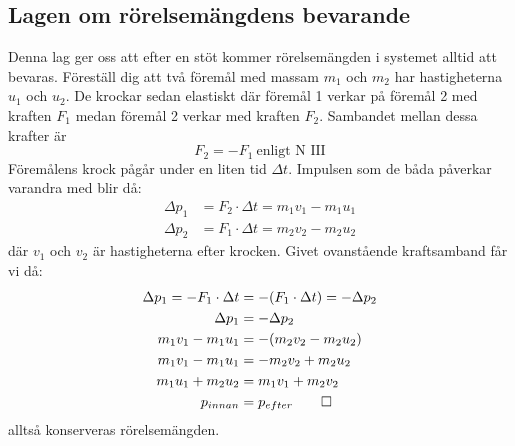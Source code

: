 \subsection{Lagen om rörelsemängdens bevarande}
\label{derive:conserverationmomentum}
Denna lag ger oss att efter en stöt kommer rörelsemängden i systemet alltid att bevaras. Föreställ dig att två föremål med massam $m_1$ och $m_2$ har hastigheterna $u_1$ och $u_2$. De krockar sedan elastiskt där föremål 1 verkar på föremål 2 med kraften $F_1$ medan föremål 2 verkar med kraften $F_2$. Sambandet mellan dessa krafter är
\begin{equation*}
    F_2 = -F_1 \: \text{enligt N III}
\end{equation*}
Föremålens krock pågår under en liten tid $\Delta t$. Impulsen som de båda påverkar varandra med blir då:
\begin{align*}
    \Delta p_1 &= F_2 \cdot \Delta t = m_1v_1 - m_1u_1 \\
    \Delta p_2 &= F_1 \cdot \Delta t = m_2v_2 - m_2u_2
\end{align*}
där $v_1$ och $v_2$ är hastigheterna efter krocken. Givet ovanstående kraftsamband får vi då:
\begin{align*}
    \Delta p_1 = -F_1 \cdot \Delta t &= -(F_1 \cdot \Delta t) = -\Delta p_2 \\
    \Delta p_1 &= -\Delta p_2 \\
    m_1v_1 - m_1u_1 &= -(m_2v_2 - m_2u_2) \\
    m_1v_1 - m_1u_1 &= -m_2v_2 + m_2u_2 \\
    m_1u_1 + m_2u_2 &= m_1v_1 + m_2v_2 \\
    p_{innan} &= p_{efter} \qed
\end{align*}
alltså konserveras rörelsemängden.
